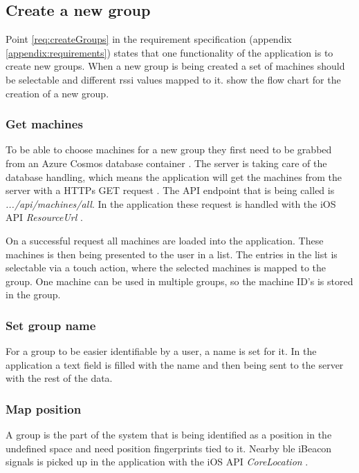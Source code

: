 \subsection{Create a new group}\label{sec:implAppNewGroup}

Point \ref{req:createGroups} in the requirement specification (appendix \ref{appendix:requirements}) states that one functionality of the application is to create new groups.
When a new group is being created a set of machines should be selectable and different \acrshort{rssi} values mapped to it.
 show the flow chart for the creation of a new group.


\subsubsection{Get machines}\label{sec:implAppNewGroupGetMachines}
To be able to choose machines for a new group they first need to be grabbed from an Azure Cosmos database container \cite{IntroductionAzureCosmos}.
The server is taking care of the database handling, which means the application will get the machines from the server with a HTTPs GET request \cite{GETHTTPMDN}.
The API endpoint that is being called is \textit{.../api/machines/all}.
In the application these request is handled with the iOS API \textit{ResourceUrl} \cite{ResourceURLAppleDeveloper}.

\bigskip

On a successful request all machines are loaded into the application.
These machines is then being presented to the user in a list.
The entries in the list is selectable via a touch action, where the selected machines is mapped to the group.
One machine can be used in multiple groups, so the machine ID's is stored in the group.


\subsubsection{Set group name}\label{sec:implAppNewGroupSetName}
For a group to be easier identifiable by a user, a name is set for it.
In the application a text field is filled with the name and then being sent to the server with the rest of the data.


\subsubsection{Map position}\label{sec:implAppNewGroupMapPos}
A group is the part of the system that is being identified as a position in the undefined space and need position fingerprints tied to it.
Nearby \acrshort{ble} iBeacon signals is picked up in the application with the iOS API \textit{CoreLocation} \cite{CoreLocationApple}.

